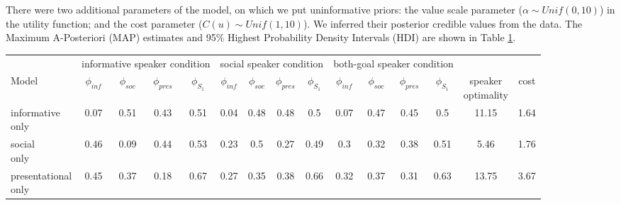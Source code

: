 \documentclass[12pt]{article}
\begin{document}
There were two additional parameters of the model, on which we put uninformative priors: the value scale parameter ($\alpha \sim Unif(0,10)$) in the utility function; and the cost parameter ($C(u) \sim Unif(1,10)$). We inferred their posterior credible values from the data. The Maximum A-Posteriori (MAP) estimates and 95\% Highest Probability Density Intervals (HDI) are shown in Table \ref{table:params}.

\begin{landscape}
\begin{table}[]
\centering
\label{table:params}
\begin{tabular}{lcccccccccccccc}
                                    & \multicolumn{4}{c}{informative speaker condition}            & \multicolumn{4}{c}{social speaker condition} & \multicolumn{4}{c}{both-goal speaker condition}             &  &   \\
Model                             & $\phi_{inf}$          & $\phi_{soc}$ & $\phi_{pres}$ & $\phi_{S_1}$ & $\phi_{inf}$          & $\phi_{soc}$ & $\phi_{pres}$ & $\phi_{S_1}$ & $\phi_{inf}$          & $\phi_{soc}$ & $\phi_{pres}$ & $\phi_{S_1}$ & \thead{speaker \\optimality}                     &    cost  \\[0.5cm]\hline
\makecell[l]{informative \\only}                    & 0.07                      & 0.51       & 0.43               & 0.51          & 0.04                 & 0.48       & 0.48               & 0.5           & 0.07               & 0.47       & 0.45               & 0.5           & 11.15              & 1.64 \\[0.5cm]
\makecell[l]{social \\only}                         & 0.46                      & 0.09       & 0.44               & 0.53          & 0.23                 & 0.5        & 0.27               & 0.49          & 0.3                & 0.32       & 0.38               & 0.51          & 5.46               & 1.76 \\[0.5cm]
\makecell[l]{presentational \\only}                 & 0.45                      & 0.37       & 0.18               & 0.67          & 0.27                 & 0.35       & 0.38               & 0.66          & 0.32               & 0.37       & 0.31               & 0.63          & 13.75              & 3.67 \\[0.5cm]

\end{tabular}
\end{table}
\end{landscape}
\end{document}
